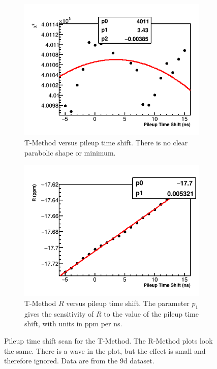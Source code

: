 \begin{figure}[h]
\centering
    \begin{subfigure}[t]{0.45\textwidth}
        \centering
        \includegraphics[width=\textwidth]{TMethod_Chi2_Vs_PileupTimeShift_Canv}
        \caption{T-Method \chisq versus pileup time shift. There is no clear parabolic shape or minimum.}
    \end{subfigure}%
    \hspace{1cm}
    \begin{subfigure}[t]{0.45\textwidth}
        \centering
        \includegraphics[width=\textwidth]{TMethod_R_Vs_PileupTimeShift_Canv}
        \caption{T-Method $R$ versus pileup time shift. The parameter $p_{1}$ gives the sensitivity of $R$ to the value of the pileup time shift, with units in ppm per ns.}
    \end{subfigure}
\caption[Pileup time shift scan]{Pileup time shift scan for the T-Method. The R-Method plots look the same. There is a wave in the \R plot, but the effect is small and therefore ignored. Data are from the 9d dataset.}
\label{fig:PTSscan}
\end{figure}


